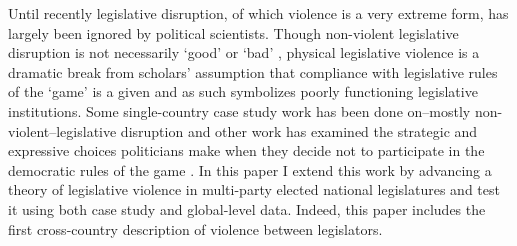 \documentclass[a4paper]{article}\usepackage[]{graphicx}\usepackage[]{color}
\begin{document}
Until recently legislative disruption, of which violence is a very extreme form, has largely been ignored by political scientists. Though non-violent legislative disruption is not necessarily `good' or `bad' \citep[see][for discussions of how non-violent disruption may act as a  `safety valve']{Ostrow1996,Young2002}, physical legislative violence is a dramatic break from scholars' assumption that compliance with legislative rules of the `game' is a given \citep{Wolfe2004} and as such symbolizes poorly functioning legislative institutions. Some single-country case study work has been done on--mostly non-violent--legislative disruption \cite[see][]{Armitage2013,Johnson2013,Ilie2013,Wolfe2004} and other work has examined the strategic and expressive choices politicians make when they decide not to participate in the democratic rules of the game \citep[e.g.][]{wilkinson2006,Beaulieu2008,Spary2013,BeaulieuForthcoming}. In this paper I extend this work by advancing a theory of legislative violence in multi-party elected national legislatures and test it using both case study and global-level data. Indeed, this paper includes the first cross-country description of violence between legislators. 
\end{document}

